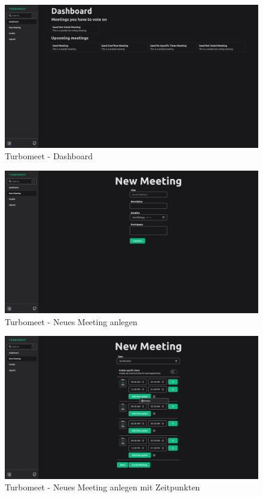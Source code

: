 \begin{figure}[th]
    \centering
    \includegraphics[width=\textwidth]{Figures/turbomeet_desktop_dashboard.png}
    \decoRule
    \caption{Turbomeet - Dashboard}
    \label{fig:turbomeet_desktop_dashboard}
\end{figure}

\begin{figure}[th]
    \centering
    \includegraphics[width=\textwidth]{Figures/turbomeet_desktop_new_meeting.png}
    \decoRule
    \caption{Turbomeet - Neues Meeting anlegen}
    \label{fig:turbomeet_desktop_new_meeting}
\end{figure}

\begin{figure}[th]
    \centering
    \includegraphics[width=\textwidth]{Figures/turbomeet_desktop_new_meeting_specific_time.png}
    \decoRule
    \caption{Turbomeet - Neues Meeting anlegen mit Zeitpunkten}
    \label{fig:turbomeet_desktop_new_meeting_specific_time}
\end{figure}

